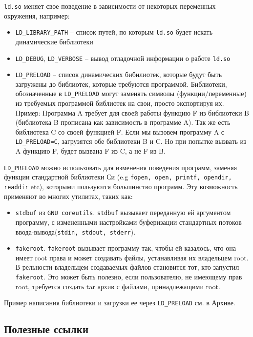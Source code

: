 \documentclass[a4paper,titlepage]{article}
\begin{document}
\texttt{ld.so} меняет свое поведение в зависимости от некоторых переменных
окружения, например:

\begin{itemize}
  \item \texttt{LD\_LIBRARY\_PATH} -- список путей, по которым \texttt{ld.so}
    будет искать динамические библиотеки
  \item \texttt{LD\_DEBUG}, \texttt{LD\_VERBOSE} -- вывод отладочной информации о
    работе \texttt{ld.so}
  \item \texttt{LD\_PRELOAD} -- список динамических бибилиотек, которые будут
    быть загружены до библиотек, которые требуются программой. Библиотеки,
    обозначенные в \texttt{LD\_PRELOAD} могут заменять символы
    (функции/переменные) из требуемых программой библиотек на свои, просто
    экспортируя их. Пример: Программа A требует для своей работы функцию F из
    библиотеки B (библиотека B прописана как зависимость в программе A). Так же
    есть библиотека C со своей функцией F. Если мы вызовем программу A с
    \texttt{LD\_PRELOAD=C}, загрузятся обе библиотеки B и C. Но при попытке
    вызвать из A функцию F, будет вызвана F из C, а не F из B.
\end{itemize}

\texttt{LD\_PRELOAD} можно использовать для изменения поведения программ,
заменяя функции стандартной библиотеки Си (e.g \texttt{fopen, open, printf,
  opendir, readdir} etc), которыми пользуются большинство программ. Эту
возможность применяют во многих утилитах, таких как:

\begin{itemize}
  \item \texttt{stdbuf} из \texttt{GNU coreutils}. \texttt{stdbuf} вызывает
    переданную ей аргументом программу, с измененными настройками буферизации
    стандартных потоков ввода-вывода(\texttt{stdin, stdout, stderr}).
  \item \texttt{fakeroot}. \texttt{fakeroot} вызывает программу так, чтобы ей
    казалось, что она имеет root права и может создавать файлы, устанавливая их
    владельцем root. В рельности владельцем создаваемых файлов становится тот,
    кто запустил \texttt{fakeroot}. Это может быть полезно, если пользователю, не
    имеющему прав root, требуется создать tar архив с файлами, принадлежащими
    root.
\end{itemize}

Пример написания библиотеки и загрузки ее через \texttt{LD\_PRELOAD} см. в Архиве.

\subsection{Полезные ссылки}
\end{document}
